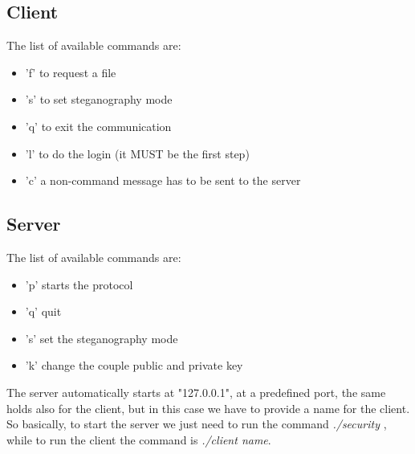 \subsection{Client}
The list of available commands are:
\begin{itemize}
	\item 'f' to request a file
	\item 's' to set steganography mode
	\item 'q' to exit the communication
	\item 'l' to do the login (it MUST be the first step)
	\item 'c' a non-command message has to be sent to the server
\end{itemize} 

\subsection{Server}
The list of available commands are:
\begin{itemize}
	\item 'p' starts the protocol
	\item 'q' quit
	\item 's' set the steganography mode
	\item 'k' change the couple public and private key
\end{itemize}

The server automatically starts at "127.0.0.1", at a predefined port, the same holds also for the client, but in this case we have to provide a name for the client.
So basically, to start the server we just need to run the command \emph{ ./security }, while to run the client the command is \emph{ ./client name}.